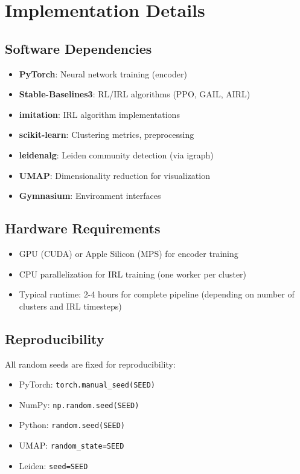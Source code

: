 \documentclass{article}
\begin{document}
\section{Implementation Details}

\subsection{Software Dependencies}

\begin{itemize}
    \item \textbf{PyTorch}: Neural network training (encoder)
    \item \textbf{Stable-Baselines3}: RL/IRL algorithms (PPO, GAIL, AIRL)
    \item \textbf{imitation}: IRL algorithm implementations
    \item \textbf{scikit-learn}: Clustering metrics, preprocessing
    \item \textbf{leidenalg}: Leiden community detection (via igraph)
    \item \textbf{UMAP}: Dimensionality reduction for visualization
    \item \textbf{Gymnasium}: Environment interfaces
\end{itemize}

\subsection{Hardware Requirements}

\begin{itemize}
    \item GPU (CUDA) or Apple Silicon (MPS) for encoder training
    \item CPU parallelization for IRL training (one worker per cluster)
    \item Typical runtime: 2-4 hours for complete pipeline (depending on number of clusters and IRL timesteps)
\end{itemize}

\subsection{Reproducibility}

All random seeds are fixed for reproducibility:
\begin{itemize}
    \item PyTorch: \texttt{torch.manual\_seed(SEED)}
    \item NumPy: \texttt{np.random.seed(SEED)}
    \item Python: \texttt{random.seed(SEED)}
    \item UMAP: \texttt{random\_state=SEED}
    \item Leiden: \texttt{seed=SEED}
\end{itemize}
\end{document}

